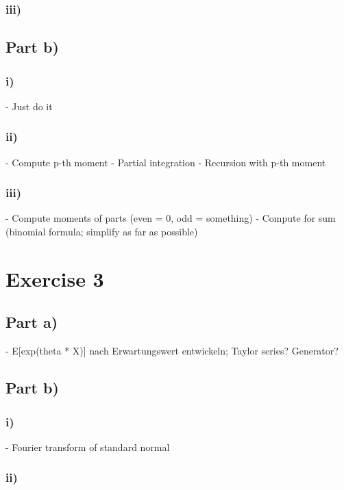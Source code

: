 \documentclass[10pt,a4paper]{article}
\begin{document}
\subsubsection*{iii)}

\subsection*{Part b)}

\subsubsection*{i)}

- Just do it

\subsubsection*{ii)}

- Compute p-th moment
- Partial integration
- Recursion with p-th moment

\subsubsection*{iii)}

- Compute moments of parts (even = 0, odd = something)
- Compute for sum (binomial formula; simplify as far as possible)

\section*{Exercise 3}

\subsection*{Part a)}

- E[exp(theta * X)] nach Erwartungswert entwickeln; Taylor series? Generator?

\subsection*{Part b)}

\subsubsection*{i)}

- Fourier transform of standard normal

\subsubsection*{ii)}
\end{document}

